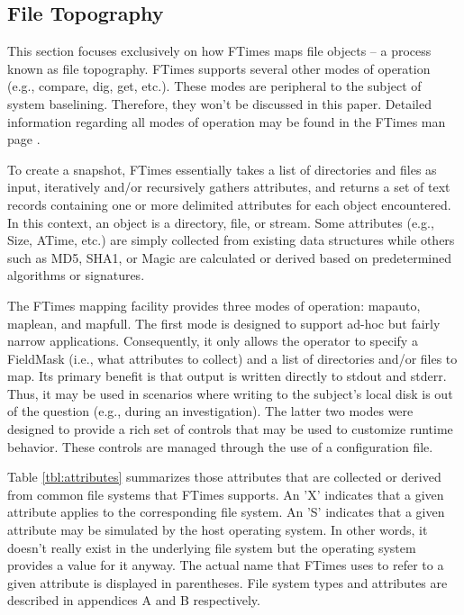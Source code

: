 \documentclass[10pt]{article}
\begin{document}
\subsection{File Topography}

This section focuses exclusively on how FTimes maps file objects -- a
process known as file topography.  FTimes supports several other modes
of operation (e.g., compare, dig, get, etc.).  These modes are
peripheral to the subject of system baselining.  Therefore, they won't
be discussed in this paper.  Detailed information regarding all modes
of operation may be found in the FTimes man page \cite{ftimes}.

To create a snapshot, FTimes essentially takes a list of directories
and files as input, iteratively and/or recursively gathers attributes,
and returns a set of text records containing one or more delimited
attributes for each object encountered.  In this context, an object is
a directory, file, or stream.  Some attributes (e.g., Size, ATime,
etc.) are simply collected from existing data structures while others
such as MD5, SHA1, or Magic are calculated or derived based on
predetermined algorithms or signatures.

The FTimes mapping facility provides three modes of operation:
mapauto, maplean, and mapfull.  The first mode is designed to support
ad-hoc but fairly narrow applications.  Consequently, it only allows
the operator to specify a FieldMask (i.e., what attributes to collect)
and a list of directories and/or files to map.  Its primary benefit is
that output is written directly to stdout and stderr.  Thus, it may be
used in scenarios where writing to the subject's local disk is out of
the question (e.g., during an investigation).  The latter two modes
were designed to provide a rich set of controls that may be used to
customize runtime behavior.  These controls are managed through the
use of a configuration file.

Table \ref{tbl:attributes} summarizes those attributes that are
collected or derived from common file systems that FTimes supports.
An 'X' indicates that a given attribute applies to the corresponding
file system.  An 'S' indicates that a given attribute may be simulated
by the host operating system.  In other words, it doesn't really exist
in the underlying file system but the operating system provides a
value for it anyway.  The actual name that FTimes uses to refer to a
given attribute is displayed in parentheses.  File system types and
attributes are described in appendices A and B respectively.
\end{document}
